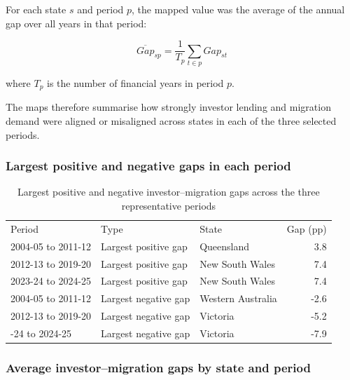 \documentclass[
  11pt,
  a4paper,
]{article}
\begin{document}
For each state \(s\) and period \(p\), the mapped value was the average
of the annual gap over all years in that period:

\[
\overline{Gap}_{sp} = \frac{1}{T_p}\sum_{t \in p} Gap_{st}
\]

where \(T_p\) is the number of financial years in period \(p\).

The maps therefore summarise how strongly investor lending and migration
demand were aligned or misaligned across states in each of the three
selected periods.

\subsubsection{Largest positive and negative gaps in each
period}\label{largest-positive-and-negative-gaps-in-each-period}

\begin{longtable}[t]{lllr}

\caption{\label{tbl-app-q3-key-values}Largest positive and negative
investor--migration gaps across the three representative periods}

\tabularnewline

\\
\toprule
Period & Type & State & Gap (pp)\\
\midrule
2004-05 to 2011-12 & Largest positive gap & Queensland & 3.8\\
2012-13 to 2019-20 & Largest positive gap & New South Wales & 7.4\\
2023-24 to 2024-25 & Largest positive gap & New South Wales & 7.4\\
2004-05 to 2011-12 & Largest negative gap & Western Australia & -2.6\\
2012-13 to 2019-20 & Largest negative gap & Victoria & -5.2\\
\addlinespace
2023-24 to 2024-25 & Largest negative gap & Victoria & -7.9\\
\bottomrule

\end{longtable}

\subsubsection{Average investor--migration gaps by state and
period}\label{average-investormigration-gaps-by-state-and-period}
\end{document}
